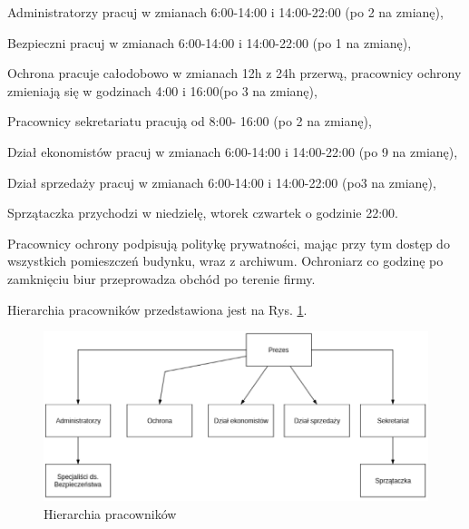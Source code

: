 \hspace{-0.5cm}\begin{minipage}{13.5cm}
	\begin{itemize*}
		\item Administratorzy pracuj w zmianach 6:00-14:00 i 14:00-22:00 \linebreak (po 2 na zmianę),
		\item Bezpieczni pracuj w zmianach 6:00-14:00 i 14:00-22:00 \linebreak (po 1 na zmianę),
		\item Ochrona pracuje całodobowo w zmianach 12h z 24h przerwą, pracownicy ochrony zmieniają się w godzinach 4:00 i 16:00(po 3 na zmianę),
		\item Pracownicy sekretariatu pracują od 8:00- 16:00 (po 2 na zmianę),
		\item Dział ekonomistów pracuj w zmianach 6:00-14:00 i 14:00-22:00 \linebreak (po 9 na zmianę),
		\item Dział sprzedaży pracuj w zmianach 6:00-14:00 i 14:00-22:00 \linebreak (po3 na zmianę),
		\item Sprzątaczka przychodzi w niedzielę, wtorek czwartek o godzinie 22:00.
	\end{itemize*}
\end{minipage}

Pracownicy ochrony podpisują politykę prywatności, mając przy tym dostęp do wszystkich pomieszczeń budynku, wraz z archiwum. Ochroniarz co godzinę po zamknięciu biur przeprowadza obchód po terenie firmy.

Hierarchia pracowników przedstawiona jest na Rys. \ref{schemat:hierarchia_pracownikow}.
\begin{figure}[!h]
	\includegraphics[width=15cm]{Hierarchia_pracownikow.png}
	\caption{Hierarchia pracowników}
	\label{schemat:hierarchia_pracownikow}
\end{figure}

